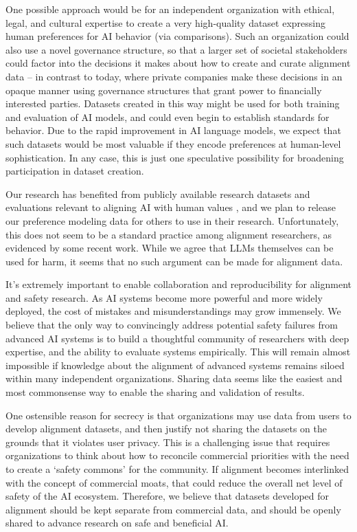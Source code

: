 One possible approach would be for an independent organization with ethical, legal, and cultural expertise to create a very high-quality dataset expressing human preferences for AI behavior (via comparisons). Such an organization could also use a novel governance structure, so that a larger set of societal stakeholders could factor into the decisions it makes about how to create and curate alignment data -- in contrast to today, where private companies make these decisions in an opaque manner using governance structures that grant power to financially interested parties.   Datasets created in this way might be used for both  training and evaluation of AI models, and could even begin to establish standards for behavior.  Due to the rapid improvement in  AI language models, we expect that such datasets would be most valuable if they encode preferences at human-level sophistication.  In any case, this is just one speculative possibility for broadening participation in dataset creation.

Our research has benefited from publicly available research datasets and evaluations relevant to aligning AI with human values \cite{stiennon2020learning, hendrycks2021aligning}, and we plan to release our preference modeling data for others to use in their research.  Unfortunately, this does not seem to be a standard practice among alignment researchers, as evidenced by some recent work.   While we agree that LLMs themselves can be used for harm, it seems that no such argument can be made for alignment  data.  

It's extremely important to enable collaboration and reproducibility for alignment and safety research.  As AI systems become more powerful and more widely deployed, the cost of mistakes and misunderstandings may grow immensely.  We believe that the only way to convincingly address potential safety failures from advanced AI systems is to build a  thoughtful community of researchers with deep expertise, and the ability to evaluate systems empirically.  This will remain almost impossible if knowledge about the alignment of advanced systems remains siloed within many independent organizations.  Sharing data seems like the easiest and most commonsense way to enable the sharing and validation of results.

One ostensible reason for secrecy is that organizations may use data from users to develop alignment datasets, and then justify not sharing the datasets on the grounds that it violates user privacy. This is a challenging issue that requires organizations to think about how to reconcile commercial priorities with the need to create a `safety commons' for the community. If alignment becomes interlinked with the concept of commercial moats, that could reduce the overall net level of safety of the AI ecosystem. Therefore, we believe that datasets developed for alignment should be kept separate from commercial data, and should be openly shared to advance research on safe and beneficial AI.

